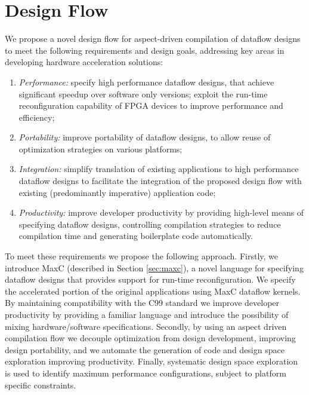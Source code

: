 \section{Design Flow}
\label{sec:design-flow}

We propose a novel design flow for aspect-driven compilation of
dataflow designs to meet the following requirements and design goals,
addressing key areas in developing hardware acceleration solutions:
\begin{enumerate}
\item \emph{Performance:} specify high performance dataflow designs, that
  achieve significant speedup over software only versions; exploit the
  run-time reconfiguration capability of FPGA devices to improve
  performance and efficiency;
\item \emph{Portability:} improve portability of dataflow designs, to
  allow reuse of optimization strategies on various platforms;
\item \emph{Integration:} simplify translation of existing
  applications to high performance dataflow designs to facilitate the
  integration of the proposed design flow with existing (predominantly
  imperative) application code;
\item \emph{Productivity:} improve developer productivity by providing
  high-level means of specifying dataflow designs, controlling
  compilation strategies to reduce compilation time and generating
  boilerplate code automatically.
\end{enumerate}

To meet these requirements we propose the following approach. Firstly,
we introduce MaxC (described in Section \ref{sec:maxc}), a novel
language for specifying dataflow designs that provides support for
run-time reconfiguration. We specify the accelerated portion of the
original applications using MaxC dataflow kernels. By maintaining
compatibility with the C99 standard we improve developer productivity
by providing a familiar language and introduce the possibility of
mixing hardware/software specifications. Secondly, by using an aspect
driven compilation flow we decouple optimization from design
development, improving design portability, and we automate the
generation of code and design space exploration improving
productivity. Finally, systematic design space exploration is used to
identify maximum performance configurations, subject to platform
specific constraints.

